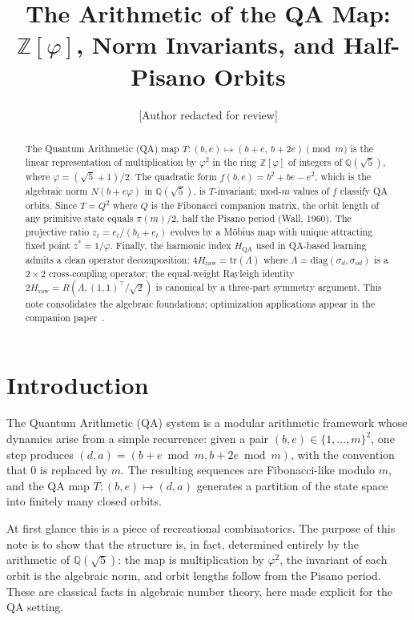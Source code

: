 \documentclass[11pt]{article}
\title{\textbf{The Arithmetic of the QA Map:\\
$\mathbb{Z}[\varphi]$, Norm Invariants, and Half-Pisano Orbits}}
\author{[Author redacted for review]}
\date{}
\theoremstyle{definition}
\theoremstyle{remark}
\newcommand{\Zfi}{\mathbb{Z}[\varphi]}
\newcommand{\Qfi}{\mathbb{Q}(\sqrt{5})}
\newcommand{\hqa}{H_{\mathrm{QA}}}
\newcommand{\hraw}{H_{\mathrm{raw}}}
\begin{document}
\maketitle

\begin{abstract}
The Quantum Arithmetic (QA) map $T:(b,e)\mapsto(b{+}e,\,b{+}2e)\pmod{m}$
is the linear representation of multiplication by $\varphi^2$ in the ring
$\Zfi$ of integers of $\Qfi$, where $\varphi=(\sqrt{5}+1)/2$.
The quadratic form $f(b,e)=b^2+be-e^2$, which is the algebraic norm
$N(b+e\varphi)$ in $\Qfi$, is $T$-invariant; mod-$m$ values of $f$ classify
QA orbits. Since $T=Q^2$ where $Q$ is the Fibonacci companion matrix, the
orbit length of any primitive state equals $\pi(m)/2$, half the Pisano period
(Wall, 1960). The projective ratio $z_t=e_t/(b_t+e_t)$ evolves by a
M\"{o}bius map with unique attracting fixed point $z^*=1/\varphi$.
Finally, the harmonic index $\hqa$ used in QA-based learning admits a clean
operator decomposition: $4\hraw=\mathrm{tr}(\Lambda)$ where
$\Lambda=\mathrm{diag}(\sigma_d,\sigma_{od})$ is a $2\times 2$ cross-coupling
operator; the equal-weight Rayleigh identity $2\hraw=R(\Lambda,(1,1)^\top/\sqrt{2})$
is canonical by a three-part symmetry argument.
This note consolidates the algebraic foundations; optimization applications
appear in the companion paper~\cite{companion}.
\end{abstract}

\tableofcontents
\bigskip

\section{Introduction}

The Quantum Arithmetic (QA) system is a modular arithmetic framework whose
dynamics arise from a simple recurrence: given a pair $(b,e)\in\{1,\ldots,m\}^2$,
one step produces $(d,a)=(b+e\bmod m, b+2e\bmod m)$, with the convention that
$0$ is replaced by $m$.  The resulting sequences are Fibonacci-like modulo $m$,
and the QA map $T:(b,e)\mapsto(d,a)$ generates a partition of the state space
into finitely many closed orbits.

At first glance this is a piece of recreational combinatorics.  The purpose of
this note is to show that the structure is, in fact, determined entirely by the
arithmetic of $\Qfi$: the map is multiplication by $\varphi^2$, the invariant
of each orbit is the algebraic norm, and orbit lengths follow from the Pisano
period.  These are classical facts in algebraic number theory, here made explicit
for the QA setting.
\end{document}
